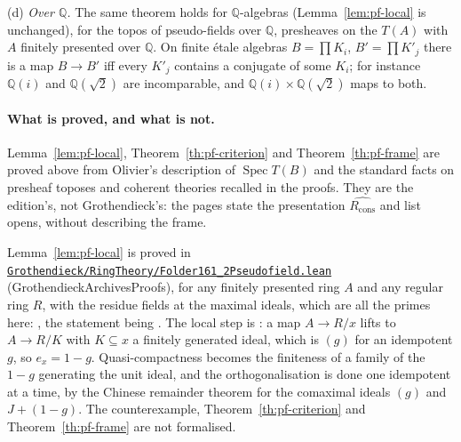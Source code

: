 (d) \emph{Over $\mathbb Q$.} The same theorem holds for $\mathbb Q$-algebras (Lemma~\ref{lem:pf-local} is unchanged), for the topos of pseudo-fields over $\mathbb Q$, presheaves on the $T(A)$ with $A$ finitely presented over $\mathbb Q$. On finite étale algebras $B = \prod K_i$, $B' = \prod K'_j$ there is a map $B\to B'$ iff every $K'_j$ contains a conjugate of some $K_i$; for instance $\mathbb Q(i)$ and $\mathbb Q(\sqrt2)$ are incomparable, and $\mathbb Q(i)\times\mathbb Q(\sqrt2)$ maps to both.

\paragraph{What is proved, and what is not.} Lemma~\ref{lem:pf-local}, Theorem~\ref{th:pf-criterion} and Theorem~\ref{th:pf-frame} are proved above from Olivier's description of $\operatorname{Spec}T(B)$ and the standard facts on presheaf toposes and coherent theories recalled in the proofs. They are the edition's, not Grothendieck's: the pages state the presentation $\widehat{R_{\mathrm{cons}}}$ and list opens, without describing the frame.

\leanentry{} Lemma~\ref{lem:pf-local} is proved in \href{https://github.com/Commutator-IO/GrothendieckArchivesProofs/blob/main/Grothendieck/RingTheory/Folder161_2Pseudofield.lean}{\nolinkurl{Grothendieck/RingTheory/Folder161\_2Pseudofield.lean}} (GrothendieckArchivesProofs), for any finitely presented ring $A$ and any regular ring $R$, with the residue fields at the maximal ideals, which are all the primes here: , the statement being . The local step is : a map $A\to R/x$ lifts to $A\to R/K$ with $K\subseteq x$ a finitely generated ideal, which is $(g)$ for an idempotent $g$, so $e_x = 1-g$. Quasi-compactness becomes the finiteness of a family of the $1-g$ generating the unit ideal, and the orthogonalisation is done one idempotent at a time, by the Chinese remainder theorem for the comaximal ideals $(g)$ and $J+(1-g)$. The counterexample, Theorem~\ref{th:pf-criterion} and Theorem~\ref{th:pf-frame} are not formalised.

